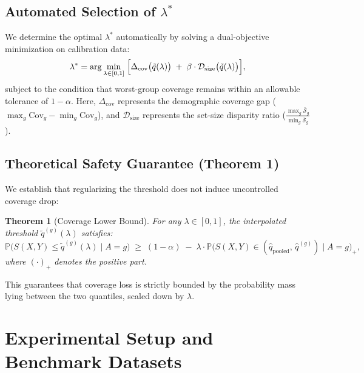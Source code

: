 \documentclass[11pt,a4paper]{article}
\newtheorem{theorem}{Theorem}
\begin{document}
\subsection{Automated Selection of $\lambda^*$}
We determine the optimal $\lambda^*$ automatically by solving a dual-objective minimization on calibration data:
\begin{equation}
\lambda^* = \arg\min_{\lambda \in [0, 1]} \;\Bigl[\Delta_{\text{cov}}\bigl(\tilde{q}(\lambda)\bigr) \;+\; \beta \cdot \mathcal{D}_{\text{size}}\bigl(\tilde{q}(\lambda)\bigr)\Bigr],
\end{equation}
subject to the condition that worst-group coverage remains within an allowable tolerance of $1 - \alpha$. Here, $\Delta_{\text{cov}}$ represents the demographic coverage gap ($\max_g \text{Cov}_g - \min_g \text{Cov}_g$), and $\mathcal{D}_{\text{size}}$ represents the set-size disparity ratio ($\frac{\max_g \bar{\mathcal{S}}_g}{\min_g \bar{\mathcal{S}}_g}$).

\subsection{Theoretical Safety Guarantee (Theorem 1)}
We establish that regularizing the threshold does not induce uncontrolled coverage drop:

\begin{theorem}[Coverage Lower Bound]
For any $\lambda \in [0, 1]$, the interpolated threshold $\tilde{q}^{(g)}(\lambda)$ satisfies:
\begin{equation}
\mathbb{P}\bigl(S(X, Y) \le \tilde{q}^{(g)}(\lambda) \mid A = g\bigr) \;\ge\; (1 - \alpha) \;-\; \lambda \cdot \mathbb{P}\bigl(S(X, Y) \in (\hat{q}_{\text{pooled}},\, \hat{q}^{(g)}) \mid A = g\bigr)_+,
\end{equation}
where $(\cdot)_+$ denotes the positive part.
\end{theorem}
This guarantees that coverage loss is strictly bounded by the probability mass lying between the two quantiles, scaled down by $\lambda$.

\section{Experimental Setup and Benchmark Datasets}
\end{document}
